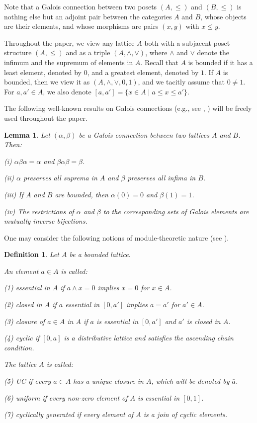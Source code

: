 \documentclass[11pt,a4paper]{amsart}
\newtheorem{lem}[theorem]{Lemma}
\newtheorem{defn}[theorem]{Definition}
\begin{document}
Note that a Galois connection between two posets $(A,\leq)$ and $(B,\leq)$ is nothing else but an adjoint pair between
the categories $A$ and $B$, whose objects are their elements, and whose morphisms are pairs $(x,y)$ with $x\leq y$. 

Throughout the paper, we view any lattice $A$ both with a subjacent poset structure $(A,\leq)$ and as a triple
$(A,\wedge,\vee)$, where $\wedge$ and $\vee$ denote the infimum and the supremum of elements in $A$. Recall that $A$ is
bounded if it has a least element, denoted by $0$, and a greatest element, denoted by $1$. If $A$ is bounded, then we
view it as $(A,\wedge,\vee,0,1)$, and we tacitly assume that $0\neq 1$. For $a,a'\in A$, we also denote $[a,a']=\{x\in
A\mid a\leq x\leq a'\}$.

The following well-known results on Galois connections (e.g., see \cite[Proposition~3.3]{AN}, \cite{Erne}) will be
freely used throughout the paper. 

\begin{lem} \label{l:galois} Let $(\alpha,\beta)$ be a Galois connection between two lattices $A$ and $B$. Then: 

(i) $\alpha\beta\alpha=\alpha$ and $\beta\alpha\beta=\beta$.

(ii) $\alpha$ preserves all suprema in $A$ and $\beta$ preserves all infima in $B$. 

(iii) If $A$ and $B$ are bounded, then $\alpha(0)=0$ and $\beta(1)=1$. 

(iv) The restrictions of $\alpha$ and $\beta$ to the corresponding sets of Galois elements are mutually inverse
bijections.
\end{lem}

One may consider the following notions of module-theoretic nature (see \cite{DHSW, GP, Schmidt}).

\begin{defn} \label{d:ess} \rm Let $A$ be a bounded lattice. 

An element $a\in A$ is called:

(1) {\it essential} in $A$ if $a\wedge x=0$ implies $x=0$ for $x\in A$.

(2) {\it closed} in $A$ if $a$ essential in $[0,a']$ implies $a=a'$ for $a'\in A$.

(3) {\it closure} of $a\in A$ in $A$ if $a$ is essential in $[0,a']$ and $a'$ is closed in $A$.

(4) {\it cyclic} if $[0,a]$ is a distributive lattice and satisfies the ascending chain condition.

The lattice $A$ is called:

(5) {\it UC} if every $a\in A$ has a unique closure in $A$, which will be denoted by $\bar
a$.

(6) {\it uniform} if every non-zero element of $A$ is essential in $[0,1]$. 

(7) {\it cyclically generated} if every element of $A$ is a join of cyclic elements.
\end{defn}
\end{document}
